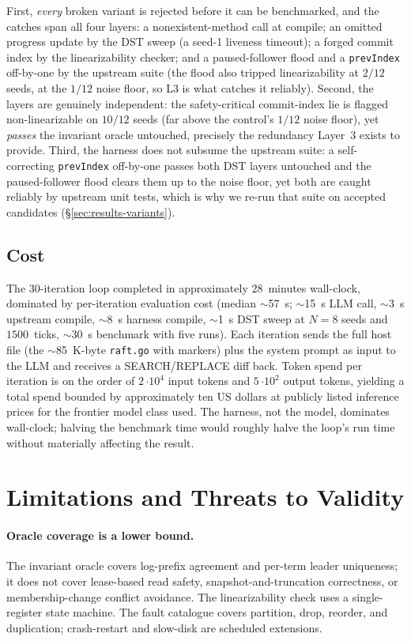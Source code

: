 \documentclass{article}
\begin{document}
First, \emph{every} broken variant is rejected before it can be
benchmarked, and the catches span all four layers: a
nonexistent-method call at compile; an omitted progress update by the
DST sweep (a seed-1 liveness timeout); a forged commit index by the
linearizability checker; and a paused-follower flood and a
\texttt{prevIndex} off-by-one by the upstream suite (the flood also
tripped linearizability at $2/12$ seeds, at the $1/12$ noise floor, so
L3 is what catches it reliably). Second, the
layers are genuinely independent: the safety-critical commit-index
lie is flagged non-linearizable on $10/12$ seeds (far above the
control's $1/12$ noise floor), yet \emph{passes} the invariant oracle
untouched, precisely the redundancy Layer~3 exists to provide. Third,
the harness does not subsume the upstream suite: a self-correcting
\texttt{prevIndex} off-by-one passes both DST layers untouched and the
paused-follower flood clears them up to the noise floor, yet both are
caught reliably by upstream unit tests, which is why we re-run that
suite on accepted candidates (\S\ref{sec:results-variants}).

\subsection{Cost}
\label{sec:results-cost}
The $30$-iteration loop completed in approximately $28$~minutes
wall-clock, dominated by per-iteration evaluation cost
(median $\sim$57~s; $\sim$15~s LLM call, $\sim$3~s upstream compile,
$\sim$8~s harness compile, $\sim$1~s DST sweep at $N=8$ seeds and
$1500$~ticks, $\sim$30~s benchmark with five runs). Each iteration
sends the full host file (the $\sim$85~K-byte \texttt{raft.go} with
markers) plus the system prompt as input to the LLM and receives a
SEARCH/REPLACE diff back. Token spend per iteration is on the order
of $2$\,$\cdot 10^{4}$ input tokens and $5$\,$\cdot 10^{2}$ output tokens,
yielding a total spend bounded by approximately ten US dollars at
publicly listed inference prices for the frontier model class used.
The harness, not the model, dominates wall-clock; halving the
benchmark time would roughly halve the loop's run time without
materially affecting the result.

\section{Limitations and Threats to Validity}
\label{sec:limits}

\paragraph{Oracle coverage is a lower bound.}
The invariant oracle covers log-prefix agreement and per-term leader
uniqueness; it does not cover lease-based read safety,
snapshot-and-truncation correctness, or membership-change conflict
avoidance. The linearizability check uses a single-register state
machine. The fault catalogue covers partition, drop, reorder, and
duplication; crash-restart and slow-disk are scheduled extensions.
\end{document}

